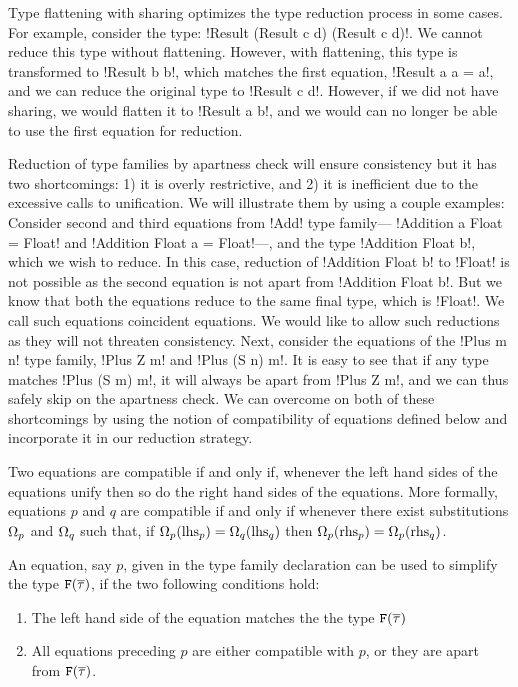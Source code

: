 \documentclass[format=acmsmall,manuscript,screen,nonacm,margin=1in,11pt]{acmart}
\begin{document}
Type flattening with sharing optimizes the type reduction process in some cases.
For example, consider the type: !Result (Result c d) (Result c d)!.
We cannot reduce this type without flattening. However, with flattening,
this type is transformed to !Result b b!, which matches the first equation, !Result a a = a!,
and we can reduce the original type to !Result c d!.
However, if we did not have sharing, we would flatten it to !Result a b!,
and we would can no longer be able to use the first equation for reduction.

Reduction of type families by apartness check will ensure consistency
but it has two shortcomings: 1) it is overly restrictive, and
2) it is inefficient due to the excessive calls to unification.
We will illustrate them by using a couple examples: Consider second and third equations from !Add! type family---
!Addition a Float = Float! and !Addition Float a = Float!---, and the type !Addition Float b!, which we wish to reduce.
In this case, reduction of !Addition Float b! to !Float! is not possible as the second equation is not apart
from !Addition Float b!. But we know that both the equations reduce to the same final type, which is !Float!.
We call such equations coincident equations. We would like to allow such reductions as they will not
threaten consistency. Next, consider the equations of the !Plus m n! type family, !Plus Z m! and !Plus (S n) m!.
It is easy to see that if any type matches !Plus (S m) m!, it will always be apart from !Plus Z m!, and
we can thus safely skip on the apartness check. We can overcome on both of these shortcomings by using the notion of compatibility
of equations defined below and incorporate it in our reduction strategy.
\begin{defn}\label{def:compact-eqns}
  Two equations are compatible if and only if, whenever the left hand sides of the equations
  unify then so do the right hand sides of the equations. %
  More formally, equations $p$ and $q$ are compatible if and only if whenever there exist substitutions
  $\Omega_p$ and $\Omega_q $ such that, if $\Omega_p(\text{lhs}_{p}) = \Omega_q(\text{lhs}_{q})$
  then $\Omega_p(\text{rhs}_{p}) = \Omega_p(\text{rhs}_{q})$.
\end{defn}
\begin{defn}\label{def:ctf-simpl}
  An equation, say $p$, given in the type family declaration can be used to simplify the type
  $\texttt{F}(\overline{\tau})$, if the two following conditions hold:
  \begin{enumerate}
  \item The left hand side of the equation matches the the type $\texttt{F}(\overline{\tau})$
  \item All equations preceding $p$ are either compatible with $p$, or they are apart from $\texttt{F}(\overline{\tau})$.
  \end{enumerate}
\end{defn}
\end{document}
